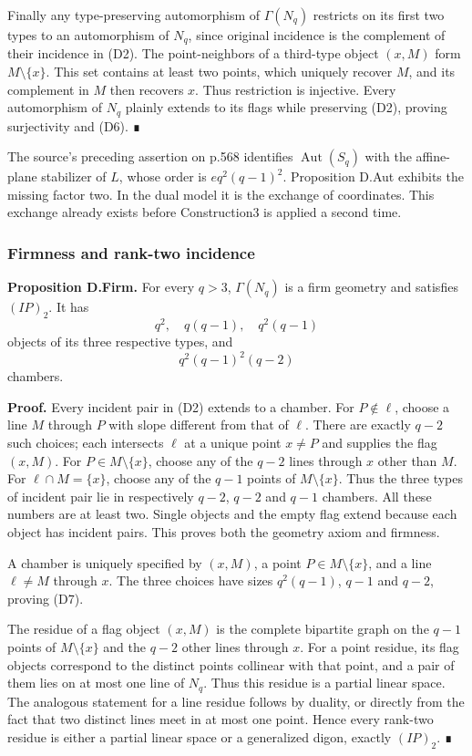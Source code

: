 Finally any type-preserving automorphism of \(\Gamma(N_q)\) restricts on
its first two types to an automorphism of \(N_q\), since original
incidence is the complement of their incidence in (D2). The
point-neighbors of a third-type object \((x,M)\) form
\(M\setminus\{x\}\). This set contains at least two points, which
uniquely recover \(M\), and its complement in \(M\) then recovers \(x\).
Thus restriction is injective. Every automorphism of \(N_q\) plainly
extends to its flags while preserving (D2), proving surjectivity and
(D6). ∎

The source's preceding assertion on p.568 identifies
\(\operatorname{Aut}(S_q)\) with the affine-plane stabilizer of \(L\),
whose order is \(e q^2(q-1)^2\). Proposition D.Aut exhibits the missing
factor two. In the dual model it is the exchange of coordinates. This
exchange already exists before Construction3 is applied a second time.

\subsubsection{Firmness and rank-two
incidence}\label{firmness-and-rank-two-incidence}

\textbf{Proposition D.Firm.} For every \(q>3\), \(\Gamma(N_q)\) is a
firm geometry and satisfies \((IP)_2\). It has \[
q^2,\quad q(q-1),\quad q^2(q-1)
\] objects of its three respective types, and \[
q^2(q-1)^2(q-2)
\tag{D7}
\] chambers.

\textbf{Proof.} Every incident pair in (D2) extends to a chamber. For
\(P\notin\ell\), choose a line \(M\) through \(P\) with slope different
from that of \(\ell\). There are exactly \(q-2\) such choices; each
intersects \(\ell\) at a unique point \(x\ne P\) and supplies the flag
\((x,M)\). For \(P\in M\setminus\{x\}\), choose any of the \(q-2\) lines
through \(x\) other than \(M\). For \(\ell\cap M=\{x\}\), choose any of
the \(q-1\) points of \(M\setminus\{x\}\). Thus the three types of
incident pair lie in respectively \(q-2\), \(q-2\) and \(q-1\) chambers.
All these numbers are at least two. Single objects and the empty flag
extend because each object has incident pairs. This proves both the
geometry axiom and firmness.

A chamber is uniquely specified by \((x,M)\), a point
\(P\in M\setminus\{x\}\), and a line \(\ell\ne M\) through \(x\). The
three choices have sizes \(q^2(q-1)\), \(q-1\) and \(q-2\), proving
(D7).

The residue of a flag object \((x,M)\) is the complete bipartite graph
on the \(q-1\) points of \(M\setminus\{x\}\) and the \(q-2\) other lines
through \(x\). For a point residue, its flag objects correspond to the
distinct points collinear with that point, and a pair of them lies on at
most one line of \(N_q\). Thus this residue is a partial linear space.
The analogous statement for a line residue follows by duality, or
directly from the fact that two distinct lines meet in at most one
point. Hence every rank-two residue is either a partial linear space or
a generalized digon, exactly \((IP)_2\). ∎

